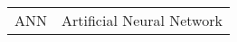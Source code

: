 



\begin{longtable}{p{90pt}l}
\hline ANN    	&\vline  Artificial Neural Network \\
\end{longtable}






